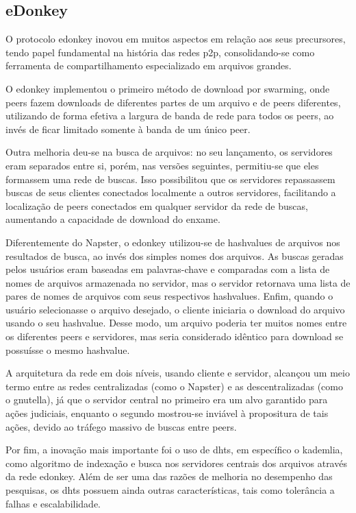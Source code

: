 \subsection*{eDonkey}

O protocolo \gls{edonkey} inovou em muitos aspectos em relação aos seus precursores,
tendo papel fundamental na história das redes \gls*{p2p}, consolidando-se como
ferramenta de compartilhamento especializado em arquivos grandes.

O \gls*{edonkey} implementou o primeiro método de download por \gls{swarming}, onde
\glspl*{peer} fazem downloads de diferentes partes de um arquivo e de \glspl*{peer}
diferentes, utilizando de forma efetiva a largura de banda de rede para todos os
\glspl*{peer}, ao invés de ficar limitado somente à banda de um único \gls*{peer}.

Outra melhoria deu-se na busca de arquivos: no seu lançamento, os servidores eram
separados entre si, porém, nas versões seguintes, permitiu-se que eles formassem uma
rede de buscas. Isso possibilitou que os servidores repassassem buscas de seus clientes
conectados localmente a outros servidores, facilitando a localização de \glspl*{peer}
conectados em qualquer servidor da rede de buscas, aumentando a capacidade de download
do enxame.

Diferentemente do Napster, o \gls*{edonkey} utilizou-se de \glspl{hashvalue} de arquivos
nos resultados de busca, ao invés dos simples nomes dos arquivos. As buscas geradas
pelos usuários eram baseadas em palavras-chave e comparadas com a lista de nomes de
arquivos armazenada no servidor, mas o servidor retornava uma lista de pares de nomes
de arquivos com seus respectivos \glspl*{hashvalue}. Enfim, quando o usuário
selecionasse o arquivo desejado, o cliente iniciaria o download do arquivo usando o seu
\gls*{hashvalue}. Desse modo, um arquivo poderia ter muitos nomes entre os diferentes
\glspl*{peer} e servidores, mas seria considerado idêntico para download se possuísse o
mesmo \gls*{hashvalue}.

A arquitetura da rede em dois níveis, usando cliente e servidor, alcançou um meio termo
entre as redes centralizadas (como o Napster) e as descentralizadas (como o
\gls*{gnutella}), já que o servidor central no primeiro era um alvo garantido para ações
judiciais, enquanto o segundo mostrou-se inviável à propositura de tais ações, devido
ao tráfego massivo de buscas entre \glspl*{peer}.

Por fim, a inovação mais importante foi o uso de \glspl{dht}, em específico o
\gls{kademlia}, como algoritmo de indexação e busca nos servidores centrais dos
arquivos através da rede \gls*{edonkey}. Além de ser uma das razões de melhoria no
desempenho das pesquisas, os \glspl*{dht} possuem ainda outras características, tais
como tolerância a falhas e escalabilidade.

